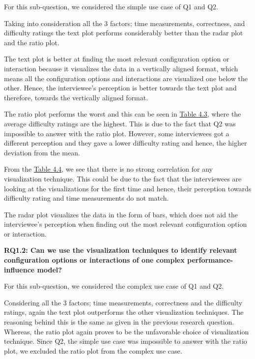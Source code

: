 For this sub-question, we considered the simple use case of Q1 and Q2.

Taking into consideration all the 3 factors; time measurements, correctness, and difficulty ratings the text plot performs considerably better than the radar plot and the ratio plot.

The text plot is better at finding the most relevant configuration option or interaction because it visualizes the data in a vertically aligned format, which means all the configuration options and interactions are visualized one below the other. Hence, the interviewee's perception is better towards the text plot and therefore, towards the vertically aligned format. 

The ratio plot performs the worst and this can be seen in  \hyperref[table:rating]{Table 4.3}, where the average difficulty ratings are the highest. This is due to the fact that Q2 was impossible to answer with the ratio plot. However, some interviewees got a different perception and they gave a lower difficulty rating and hence, the higher deviation from the mean. 

From the \hyperref[table:pearons]{Table 4.4}, we see that there is no strong correlation for any visualization technique. This could be due to the fact that the interviewees are looking at the visualizations for the first time and hence, their perception towards difficulty rating and time measurements do not match.

The radar plot visualizes the data in the form of bars, which does not aid the interviewee's perception when finding out the most relevant configuration option or interaction. 

\vskip 0.2in
\begin{mdframed}
\textbf{RQ1.2: Can we use the visualization techniques to identify relevant configuration options or interactions  of one complex performance-influence model?}
\end{mdframed}

For this sub-question, we considered the complex use case of Q1 and Q2.

Considering all the 3 factors; time measurements, correctness and the difficulty ratings, again the text plot outperforms the other visualization techniques. The reasoning behind this is the same as given in the previous research question. Whereas, the ratio plot again proves to be the unfavorable choice of visualization technique. Since Q2, the simple use case was impossible to answer with the ratio plot, we excluded the ratio plot from the complex use case.

